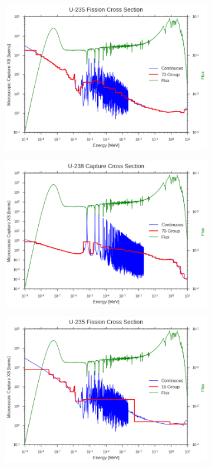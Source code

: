 \begin{figure}
\begin{subfigure}{.5\textwidth}
  \centering
  \includegraphics[width=\linewidth]{figures/intro/u235-fission-70}
  \caption{}
\end{subfigure}%
\begin{subfigure}{.5\textwidth}
  \centering
  \includegraphics[width=\linewidth]{figures/intro/u238-capture-70}
  \caption{}
\end{subfigure}
\begin{subfigure}{.5\textwidth}
  \centering
  \includegraphics[width=\linewidth]{figures/intro/u235-fission-16}

\end{subfigure}
\end{figure}
